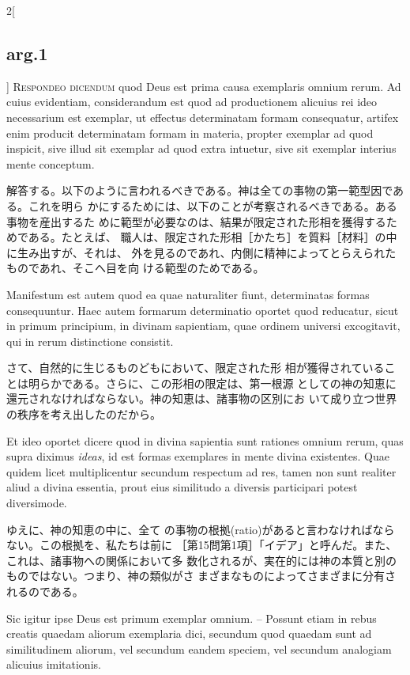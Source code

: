 \documentclass[paper=a4paper,fontsize=10pt,jafontsize=9pt,titlepage]{jlreq}
\begin{document}
\begin{paracol}{2}[\subsection{arg.1}]
{\scshape Respondeo dicendum} quod Deus est prima causa exemplaris
omnium rerum. Ad cuius evidentiam, considerandum est quod ad
productionem alicuius rei ideo necessarium est exemplar, ut effectus
determinatam formam consequatur, artifex enim producit determinatam
formam in materia, propter exemplar ad quod inspicit, sive illud sit
exemplar ad quod extra intuetur, sive sit exemplar interius mente
conceptum.

\switchcolumn

解答する。以下のように言われるべきである。神は全ての事物の第一範型因である。これを明ら
かにするためには、以下のことが考察されるべきである。ある事物を産出するた
めに範型が必要なのは、結果が限定された形相を獲得するためである。たとえば、
職人は、限定された形相［かたち］を質料［材料］の中に生み出すが、それは、
外を見るのであれ、内側に精神によってとらえられたものであれ、そこへ目を向
ける範型のためである。

\switchcolumn*

Manifestum est autem quod ea quae naturaliter fiunt,
determinatas formas consequuntur. Haec autem formarum determinatio
oportet quod reducatur, sicut in primum principium, in divinam
sapientiam, quae ordinem universi excogitavit, qui in rerum distinctione
consistit.

\switchcolumn

さて、自然的に生じるものどもにおいて、限定された形
相が獲得されていることは明らかである。さらに、この形相の限定は、第一根源
としての神の知恵に還元されなければならない。神の知恵は、諸事物の区別にお
いて成り立つ世界の秩序を考え出したのだから。

\switchcolumn*

Et ideo oportet dicere quod in divina sapientia sunt rationes
omnium rerum, quas supra diximus {\itshape ideas}, id est formas
exemplares in mente divina existentes. Quae quidem licet multiplicentur
secundum respectum ad res, tamen non sunt realiter aliud a divina
essentia, prout eius similitudo a diversis participari potest
diversimode.

\switchcolumn

ゆえに、神の知恵の中に、全て
の事物の根拠(ratio)があると言わなければならない。この根拠を、私たちは前に
［第15問第1項］「イデア」と呼んだ。また、これは、諸事物への関係において多
数化されるが、実在的には神の本質と別のものではない。つまり、神の類似がさ
まざまなものによってさまざまに分有されるのである。

\switchcolumn*

Sic igitur ipse Deus est primum exemplar omnium. -- Possunt
etiam in rebus creatis quaedam aliorum exemplaria dici, secundum quod
quaedam sunt ad similitudinem aliorum, vel secundum eandem speciem, vel
secundum analogiam alicuius imitationis.


\end{paracol}
\end{document}
